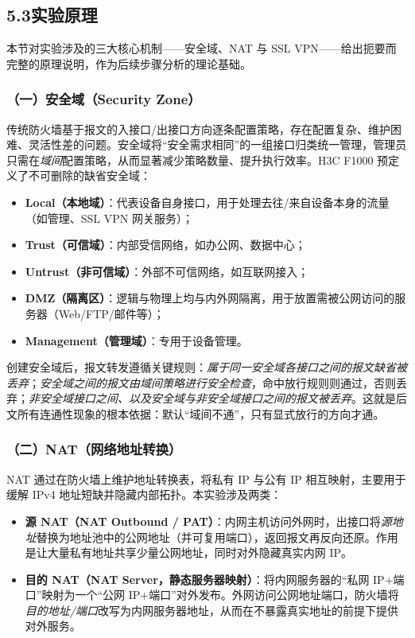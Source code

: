 \documentclass[12pt,a4paper]{article}
\begin{document}
\subsection*{5.3\quad 实验原理}
本节对实验涉及的三大核心机制——安全域、NAT 与 SSL VPN——给出扼要而完整的原理说明，作为后续步骤分析的理论基础。

\subsubsection*{（一）安全域（Security Zone）}
传统防火墙基于报文的入接口/出接口方向逐条配置策略，存在配置复杂、维护困难、灵活性差的问题。安全域将“安全需求相同”的一组接口归类统一管理，管理员只需在\emph{域间}配置策略，从而显著减少策略数量、提升执行效率。H3C F1000 预定义了不可删除的缺省安全域：

\begin{itemize}[leftmargin=1.6em]
  \item \textbf{Local（本地域）}：代表设备自身接口，用于处理去往/来自设备本身的流量（如管理、SSL VPN 网关服务）；
  \item \textbf{Trust（可信域）}：内部受信网络，如办公网、数据中心；
  \item \textbf{Untrust（非可信域）}：外部不可信网络，如互联网接入；
  \item \textbf{DMZ（隔离区）}：逻辑与物理上均与内外网隔离，用于放置需被公网访问的服务器（Web/FTP/邮件等）；
  \item \textbf{Management（管理域）}：专用于设备管理。
\end{itemize}

创建安全域后，报文转发遵循关键规则：\emph{属于同一安全域各接口之间的报文缺省被丢弃}；\emph{安全域之间的报文由域间策略进行安全检查}，命中放行规则则通过，否则丢弃；\emph{非安全域接口之间、以及安全域与非安全域接口之间的报文被丢弃}。这就是后文所有连通性现象的根本依据：默认“域间不通”，只有显式放行的方向才通。

\subsubsection*{（二）NAT（网络地址转换）}
NAT 通过在防火墙上维护地址转换表，将私有 IP 与公有 IP 相互映射，主要用于缓解 IPv4 地址短缺并隐藏内部拓扑。本实验涉及两类：
\begin{itemize}[leftmargin=1.6em]
  \item \textbf{源 NAT（NAT Outbound / PAT）}：内网主机访问外网时，出接口将\emph{源地址}替换为地址池中的公网地址（并可复用端口），返回报文再反向还原。作用是让大量私有地址共享少量公网地址，同时对外隐藏真实内网 IP。
  \item \textbf{目的 NAT（NAT Server，静态服务器映射）}：将内网服务器的“私网 IP+端口”映射为一个“公网 IP+端口”对外发布。外网访问公网地址端口，防火墙将\emph{目的地址/端口}改写为内网服务器地址，从而在不暴露真实地址的前提下提供对外服务。
\end{itemize}
\end{document}
